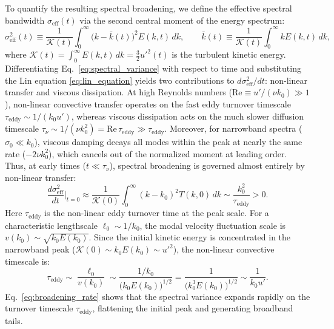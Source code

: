 \documentclass[lineno]{jfm}
\begin{document}
To quantify the resulting spectral broadening, we define the effective spectral bandwidth $\sigma_{\text{eff}}(t)$ via the second central moment of the energy spectrum:
\begin{equation}
\sigma_{\text{eff}}^2(t) \equiv \frac{1}{\mathcal{K}(t)} \int_0^\infty \big(k - \bar{k}(t)\big)^2 E(k,t)\,dk, \qquad \bar{k}(t) \equiv \frac{1}{\mathcal{K}(t)} \int_0^\infty k E(k,t)\,dk,
\label{eq:spectral_variance}
\end{equation}
where $\mathcal{K}(t) = \int_0^\infty E(k,t)\,dk = \frac{3}{2}u'^2(t)$ is the turbulent kinetic energy. Differentiating Eq.~\eqref{eq:spectral_variance} with respect to time and substituting the Lin equation \eqref{eq:lin_equation} yields two contributions to $d\sigma_{\text{eff}}^2/dt$: non-linear transfer and viscous dissipation. At high Reynolds numbers ($\mathrm{Re} \equiv u'/(\nu k_0) \gg 1$), non-linear convective transfer operates on the fast eddy turnover timescale $\tau_{\text{eddy}} \sim 1/(k_0 u')$, whereas viscous dissipation acts on the much slower diffusion timescale $\tau_\nu \sim 1/(\nu k_0^2) = \mathrm{Re}\,\tau_{\text{eddy}} \gg \tau_{\text{eddy}}$. Moreover, for narrowband spectra ($\sigma_0 \ll k_0$), viscous damping decays all modes within the peak at nearly the same rate ($-2\nu k_0^2$), which cancels out of the normalized moment at leading order. Thus, at early times ($t \ll \tau_\nu$), spectral broadening is governed almost entirely by non-linear transfer:
\begin{equation}
\frac{d \sigma_{\text{eff}}^2}{dt}\Big|_{t=0} \approx \frac{1}{\mathcal{K}(0)} \int_0^\infty (k - k_0)^2 T(k, 0)\,dk \sim \frac{k_0^2}{\tau_{\text{eddy}}} > 0.
\label{eq:broadening_rate}
\end{equation}
Here $\tau_{\text{eddy}}$ is the non-linear eddy turnover time at the peak scale. For a characteristic lengthscale $\ell_0 \sim 1/k_0$, the modal velocity fluctuation scale is $v(k_0) \sim \sqrt{k_0 E(k_0)}$. Since the initial kinetic energy is concentrated in the narrowband peak ($\mathcal{K}(0) \sim k_0 E(k_0) \sim u'^2$), the non-linear convective timescale is:
\begin{equation}
\tau_{\text{eddy}} \sim \frac{\ell_0}{v(k_0)} \sim \frac{1/k_0}{\big(k_0 E(k_0)\big)^{1/2}} = \frac{1}{\big(k_0^3 E(k_0)\big)^{1/2}} \sim \frac{1}{k_0 u'}.
\label{eq:eddy_turnover_time}
\end{equation}
Eq.~\eqref{eq:broadening_rate} shows that the spectral variance expands rapidly on the turnover timescale $\tau_{\text{eddy}}$, flattening the initial peak and generating broadband tails.
\end{document}
